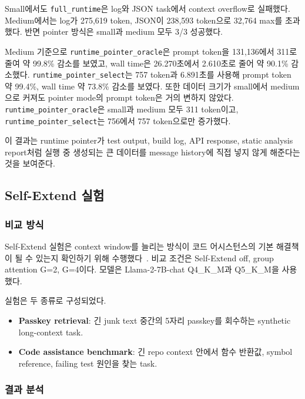 \documentclass[11pt,a4paper]{article}
\begin{document}
Small에서도 \texttt{full\_runtime}은 log와 JSON task에서 context overflow로 실패했다. Medium에서는 log가 275,619 token, JSON이 238,593 token으로 32,764 max를 초과했다. 반면 pointer 방식은 small과 medium 모두 3/3 성공했다.

Medium 기준으로 \texttt{runtime\_pointer\_oracle}은 prompt token을 131,136에서 311로 줄여 약 99.8\% 감소를 보였고, wall time은 26.270초에서 2.610초로 줄어 약 90.1\% 감소했다. \texttt{runtime\_pointer\_select}는 757 token과 6.891초를 사용해 prompt token 약 99.4\%, wall time 약 73.8\% 감소를 보였다. 또한 데이터 크기가 small에서 medium으로 커져도 pointer mode의 prompt token은 거의 변하지 않았다. \texttt{runtime\_pointer\_oracle}은 small과 medium 모두 311 token이고, \texttt{runtime\_pointer\_select}는 756에서 757 token으로만 증가했다.

이 결과는 runtime pointer가 test output, build log, API response, static analysis report처럼 실행 중 생성되는 큰 데이터를 message history에 직접 넣지 않게 해준다는 것을 보여준다.

\subsection{Self-Extend 실험}

\subsubsection{비교 방식}

Self-Extend 실험은 context window를 늘리는 방식이 코드 어시스턴스의 기본 해결책이 될 수 있는지 확인하기 위해 수행했다~\cite{jin2024selfextend}. 비교 조건은 Self-Extend off, group attention G=2, G=4이다. 모델은 Llama-2-7B-chat Q4\_K\_M과 Q5\_K\_M을 사용했다.

실험은 두 종류로 구성되었다.

\begin{itemize}
  \item \textbf{Passkey retrieval}: 긴 junk text 중간의 5자리 passkey를 회수하는 synthetic long-context task.
  \item \textbf{Code assistance benchmark}: 긴 repo context 안에서 함수 반환값, symbol reference, failing test 원인을 찾는 task.
\end{itemize}

\subsubsection{결과 분석}
\end{document}
